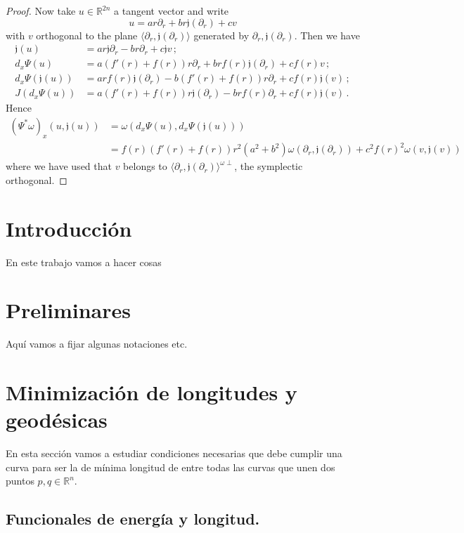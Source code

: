 \documentclass[12pt,reqno]{amsart}
\newcommand{\bd}{\partial}
\newcommand{\RR}{\mathbb{R}}
\renewcommand{\o}{\omega}
\newcommand{\frj}{\mathfrak{j}}
\begin{document}
{\begin{proof}
Now take $u \in \RR^{2n}$ a tangent vector and write
$$
u=ar \bd_r + b r\frj (\bd_r) + cv
$$
with $v$ orthogonal to the plane $\langle \bd_r, \frj (\bd_r) \rangle$ generated by $\bd_r , \frj (\bd_r)$.
Then we have
\begin{align*}
\frj (u)  & = ar  \frj \bd_r - br \bd_r + c \frj v \, ; \\
d_x \Psi(u) &  = a(f'(r) + f(r)) r \bd_r + b r f(r) \frj (\bd_r) + cf(r) v \, ; \\
d_x \Psi(\frj (u)) & = ar f(r) \frj (\bd_r) - b (f'(r)+f(r))r \bd_r + cf(r)\frj (v) \, ; \\
J(d_x \Psi(u)) & = a(f'(r) + f(r)) r \frj (\bd_r)-br f(r) \bd_r + cf(r) \frj (v) \, .
\end{align*}
Hence
\begin{align*}
(\Psi^* \o)_x(u,\frj (u)) & =\o(d_x \Psi(u), d_x \Psi (\frj (u))) \\
& = f(r)(f'(r)+f(r))r^2 (a^2+b^2)\o(\bd_r,\frj (\bd_r)) + c^2 f(r)^2 \o(v,\frj (v))
\end{align*}
where we have used that $v$ belongs to $\langle \bd_r, \frj (\bd_r) \rangle^{\o \perp}$, the symplectic orthogonal.
\end{proof}
}

\section{Introducci\'on}

En este trabajo vamos a hacer cosas

\section{Preliminares}

Aqu\'i vamos a fijar algunas notaciones etc.

\section{Minimizaci\'on de longitudes y geod\'esicas}

En esta secci\'on vamos a estudiar condiciones necesarias que debe cumplir una curva para ser la de m\'inima longitud de entre todas las curvas que unen dos puntos $p,q \in \RR^n$.

\subsection{ Funcionales de energ\'ia y longitud.}
\end{document}

